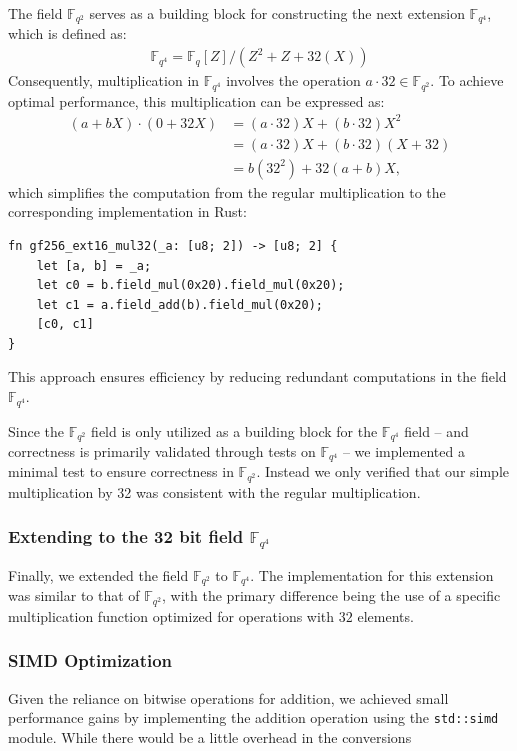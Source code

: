 \documentclass[11pt]{report}
\theoremstyle{definition}
\theoremstyle{plain}
\begin{document}
The field $\mathbb{F}_{q^2}$ serves as a building block for constructing the next extension $\mathbb{F}_{q^4}$, which is defined as:
\begin{align}
  \mathbb{F}_{q^4} = \mathbb{F}_q[Z] / (Z^2 + Z + 32(X))\label{eq:fq4}
\end{align}
Consequently, multiplication in $\mathbb{F}_{q^4}$ involves the operation $a \cdot 32 \in \mathbb{F}_{q^2}$.
To achieve optimal performance, this multiplication can be expressed as:
\begin{align*}
  (a + bX) \cdot (0 + 32X) & = (a \cdot 32)X + (b \cdot 32)X^2      \\
                           & = (a \cdot 32)X + (b \cdot 32)(X + 32) \\
                           & = b(32^2) + 32(a + b)X,
\end{align*}
which simplifies the computation from the regular multiplication to the corresponding implementation in Rust:
\begin{verbatim}
fn gf256_ext16_mul32(_a: [u8; 2]) -> [u8; 2] {
    let [a, b] = _a;
    let c0 = b.field_mul(0x20).field_mul(0x20);
    let c1 = a.field_add(b).field_mul(0x20);
    [c0, c1]
}
\end{verbatim}

This approach ensures efficiency by reducing redundant computations in the field $\mathbb{F}_{q^4}$.

Since the $\mathbb{F}_{q^2}$ field is only utilized as a building block for the $\mathbb{F}_{q^4}$ field -- and correctness is primarily validated through tests on $\mathbb{F}_{q^4}$ -- we implemented a minimal test to ensure correctness in $\mathbb{F}_{q^2}$. Instead we only verified that our simple multiplication by 32 was consistent with the regular multiplication.

\subsubsection{Extending to the 32 bit field $\mathbb{F}_{q^4}$}\label{sec:gf_256_32_bit_field}
Finally, we extended the field $\mathbb{F}_{q^2}$ to $\mathbb{F}_{q^4}$. The implementation for this extension was similar to that of $\mathbb{F}_{q^2}$, with the primary difference being the use of a specific multiplication function optimized for operations with $32$ elements.

\subsubsection{SIMD Optimization}
Given the reliance on bitwise operations for addition, we achieved small performance gains by implementing the addition operation using the \texttt{std::simd} module. While there would be a little overhead in the conversions
\end{document}

